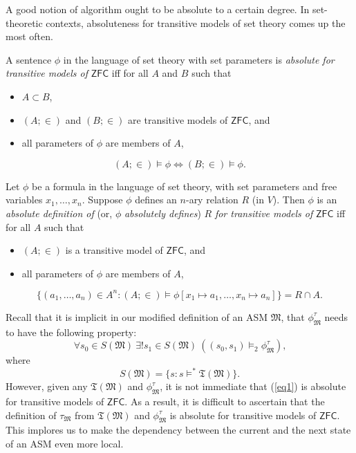 \documentclass[12pt]{article}
\numberwithin{equation}{section}
\begin{document}
A good notion of algorithm ought to be absolute to a certain degree. In set-theoretic contexts, absoluteness for transitive models of set theory comes up the most often. 

\begin{defi}
A sentence $\phi$ in the language of set theory with set parameters is \emph{absolute for transitive models of} $\mathsf{ZFC}$ iff for all $A$ and $B$ such that
\begin{itemize}
    \item $A \subset B$,
    \item $(A; \in)$ and $(B; \in)$ are transitive models of $\mathsf{ZFC}$, and
    \item all parameters of $\phi$ are members of $A$,
\end{itemize}
\begin{equation*}
    (A; \in) \models \phi \iff (B; \in) \models \phi \text{.}
\end{equation*}
\end{defi}

\begin{defi}
Let $\phi$ be a formula in the language of set theory, with set parameters and free variables $x_1, \dots, x_n$. Suppose $\phi$ defines an $n$-ary relation $R$ (in $V$). Then $\phi$ is an \emph{absolute definition of} (or, $\phi$ \emph{absolutely defines}) $R$ \emph{for transitive models of} $\mathsf{ZFC}$ iff for all $A$ such that
\begin{itemize}
    \item $(A; \in)$ is a transitive model of $\mathsf{ZFC}$, and
    \item all parameters of $\phi$ are members of $A$,
\end{itemize}
\begin{equation*}
     \{(a_1, \dots, a_n) \in A^n : (A; \in) \models \phi[x_1 \mapsto a_1, \dots, x_n \mapsto a_n]\} = R \cap A \text{.}
\end{equation*}
\end{defi}

Recall that it is implicit in our modified definition of an ASM $\mathfrak{M}$, that $\phi^{\tau}_{\mathfrak{M}}$ needs to have the following property:
\begin{equation}\label{eq1}
    \forall s_0 \in S(\mathfrak{M}) \ \exists ! s_1 \in S(\mathfrak{M}) \ ((s_0, s_1) \models_2 \phi^{\tau}_{\mathfrak{M}}) \text{,}
\end{equation}
where
\begin{equation*}
    S(\mathfrak{M}) = \{s : s \models^* \mathfrak{T}(\mathfrak{M})\} \text{.}
\end{equation*}
However, given any $\mathfrak{T}(\mathfrak{M})$ and $\phi^{\tau}_{\mathfrak{M}}$, it is not immediate that (\ref{eq1}) is absolute for transitive models of $\mathsf{ZFC}$. As a result, it is difficult to ascertain that the definition of $\tau_{\mathfrak{M}}$ from $\mathfrak{T}(\mathfrak{M})$ and $\phi^{\tau}_{\mathfrak{M}}$ is absolute for transitive models of $\mathsf{ZFC}$. This implores us to make the dependency between the current and the next state of an ASM even more local.
\end{document}
